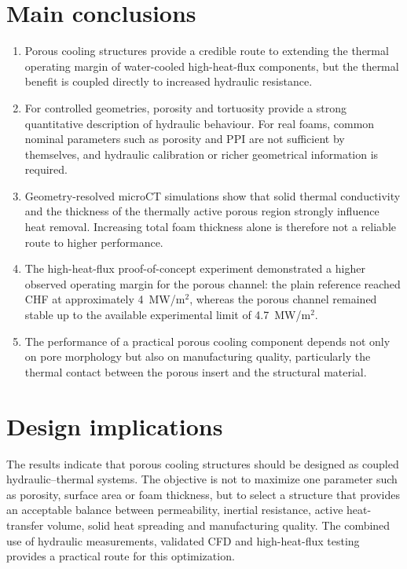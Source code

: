 \documentclass[a4paper]{article}
\begin{document}
\section{Main conclusions}
\begin{enumerate}
    \item Porous cooling structures provide a credible route to extending the thermal operating margin of water-cooled high-heat-flux components, but the thermal benefit is coupled directly to increased hydraulic resistance.
    \item For controlled geometries, porosity and tortuosity provide a strong quantitative description of hydraulic behaviour. For real foams, common nominal parameters such as porosity and PPI are not sufficient by themselves, and hydraulic calibration or richer geometrical information is required.
    \item Geometry-resolved microCT simulations show that solid thermal conductivity and the thickness of the thermally active porous region strongly influence heat removal. Increasing total foam thickness alone is therefore not a reliable route to higher performance.
    \item The high-heat-flux proof-of-concept experiment demonstrated a higher observed operating margin for the porous channel: the plain reference reached CHF at approximately 4~MW/m$^2$, whereas the porous channel remained stable up to the available experimental limit of 4.7~MW/m$^2$.
    \item The performance of a practical porous cooling component depends not only on pore morphology but also on manufacturing quality, particularly the thermal contact between the porous insert and the structural material.
\end{enumerate}

\section{Design implications}
The results indicate that porous cooling structures should be designed as coupled hydraulic--thermal systems. The objective is not to maximize one parameter such as porosity, surface area or foam thickness, but to select a structure that provides an acceptable balance between permeability, inertial resistance, active heat-transfer volume, solid heat spreading and manufacturing quality. The combined use of hydraulic measurements, validated CFD and high-heat-flux testing provides a practical route for this optimization.
\end{document}

